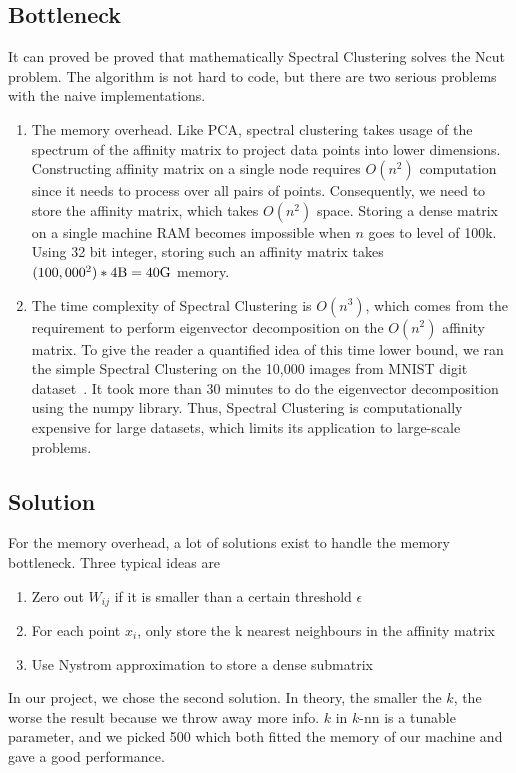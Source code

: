 \documentclass{acm_proc_article-sp}
\begin{document}
\subsection{Bottleneck}
It can proved be proved that mathematically Spectral Clustering solves the Ncut problem. The algorithm is not hard to code, but there are two serious problems with the naive implementations.
\begin{enumerate}
\item{The memory overhead. Like PCA, spectral clustering takes usage of the spectrum of the affinity matrix to project data points into lower dimensions. Constructing affinity matrix on a single node requires $O(n^2)$ computation since it needs to process over all pairs of points. Consequently, we need to store the affinity matrix, which takes $O(n^2)$ space. Storing a dense matrix on a single machine RAM becomes impossible when $n$ goes to level of 100k. Using 32 bit integer, storing such an affinity matrix takes $(100,000^2) * 4 \textnormal{B} = 40 \textnormal{G}$ memory.
}
\item{The time complexity of Spectral Clustering is $O(n^3)$, which comes from the requirement to perform eigenvector decomposition on the $O(n^2)$ affinity matrix. To give the reader a quantified idea of this time lower bound, we ran the simple Spectral Clustering on the 10,000 images from MNIST digit dataset~\cite{Lichman:2013}. It took more than 30 minutes to do the eigenvector decomposition using the numpy library. Thus, Spectral Clustering is computationally expensive for large datasets, which limits its application to large-scale problems.}
\end{enumerate}

\subsection{Solution}
For the memory overhead, a lot of solutions exist to handle the memory bottleneck. Three typical ideas are
\begin{enumerate}
\item{Zero out $W_{ij}$ if it is smaller than a certain threshold $\epsilon$}
\item{For each point $x_i$, only store the k nearest neighbours in the affinity matrix}
\item{Use Nystrom approximation to store a dense submatrix~\cite{fowlkes2004spectral}}
\end{enumerate}
In our project, we chose the second solution. In theory, the smaller the $k$, the worse the result because we throw away more info. $k$ in $k$-nn is a tunable parameter, and we picked 500 which both fitted the memory of our machine and gave a good performance. 
\end{document}
